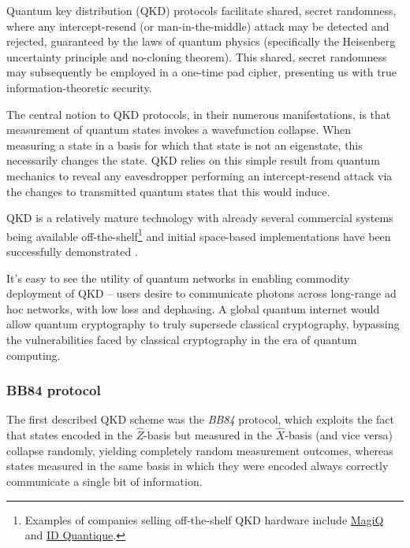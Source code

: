 Quantum key distribution (QKD) protocols facilitate shared, secret randomness, where any intercept-resend (or man-in-the-middle) attack may be detected and rejected, guaranteed by the laws of quantum physics (specifically the Heisenberg uncertainty principle and no-cloning theorem). This shared, secret randomness may subsequently be employed in a one-time pad cipher, presenting us with true information-theoretic security.

The central notion to QKD protocols, in their numerous manifestations, is that measurement of quantum states invokes a wavefunction collapse. When measuring a state in a basis for which that state is not an eigenstate, this necessarily changes the state. QKD relies on this simple result from quantum mechanics to reveal any eavesdropper performing an intercept-resend attack via the changes to transmitted quantum states that this would induce.

QKD is a relatively mature technology with already several commercial systems being available off-the-shelf\footnote{Examples of companies selling off-the-shelf QKD hardware include \href{http://www.magiqtech.com}{MagiQ} and \href{http://www.idquantique.com}{ID Quantique}.} and initial space-based implementations have been successfully demonstrated \cite{Pan}.

It's easy to see the utility of quantum networks in enabling commodity deployment of QKD -- users desire to communicate photons across long-range ad hoc networks, with low loss and dephasing. A global quantum internet would allow quantum cryptography to truly supersede classical cryptography, bypassing the vulnerabilities faced by classical cryptography in the era of quantum computing.

%
%

\subsubsection{BB84 protocol}

The first described QKD scheme was the \textit{BB84} \cite{bib:BennetBrassard84} protocol, which exploits the fact that states encoded in the $\hat{Z}$-basis but measured in the $\hat{X}$-basis (and vice versa) collapse randomly, yielding completely random measurement outcomes, whereas states measured in the same basis in which they were encoded always correctly communicate a single bit of information.

